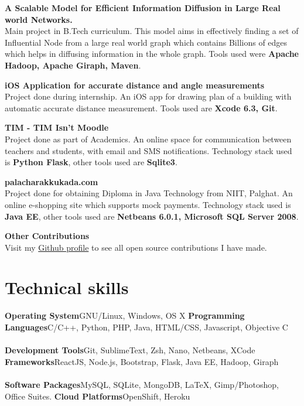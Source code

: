 \documentclass[11pt,a4paper,sans]{moderncv} %
\begin{document}
\cvlistitem
{\textbf{A Scalable Model for Efficient Information Diffusion in Large Real world Networks.}
  \\Main project in B.Tech curriculum. This model aims in effectively finding a set of Influential Node from a large real world graph which contains Billions of edges which helps in diffusing information in the whole graph. Tools used were \textbf{Apache Hadoop, Apache Giraph, Maven}. \\}

\cvlistitem
{\textbf{iOS Application for accurate distance and angle measurements}
  \\Project done during internship. An iOS app for drawing plan of a building with automatic accurate distance measurement. Tools used are \textbf{Xcode 6.3, Git}. \\}

\cvlistitem
{\textbf{TIM - TIM Isn't Moodle}
  \\Project done as part of Academics. An online space for communication between teachers and students, with email and SMS notifications. Technology stack used is \textbf{Python Flask}, other tools used are \textbf{Sqlite3}. \\}
  
\cvlistitem
{\textbf{palacharakkukada.com}
  \\Project done for obtaining Diploma in Java Technology from NIIT, Palghat. An online e-shopping site which supports mock payments. Technology stack used is \textbf{Java EE}, other tools used are \textbf{Netbeans 6.0.1, Microsoft SQL Server 2008}. \\}
  
\cvlistitem
{\textbf{Other Contributions}
  \\Visit my \href{https://github.com/bharadhwaj}{Github profile} to see all open source contributions I have made. \\}



\section{Technical skills}

\cvcomputer
{\textbf{Operating System}}{GNU/Linux, Windows, OS X}
{\textbf{Programming Languages}}{C/C++, Python, PHP, Java, HTML/CSS, Javascript, Objective C}
~\\
~\\
\cvcomputer
{\textbf{Development Tools}}{Git, SublimeText, Zsh, Nano, Netbeans, XCode}
{\textbf{Frameworks}}{ReactJS, Node.js, Bootstrap, Flask, Java EE, Hadoop, Giraph}
~\\
~\\
\cvcomputer
{\textbf{Software Packages}}{MySQL, SQLite, MongoDB, \LaTeX, Gimp/Photoshop, Office Suites.}
{\textbf{Cloud Platforms}}{OpenShift, Heroku}
{}{}
\end{document}
